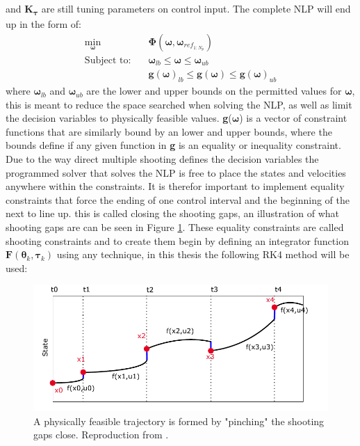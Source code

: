and \textbf{K}\textsubscript{$\bm{\tau}$} are still tuning parameters on control input. The complete NLP will end up in the form of:
\begin{subequations}
    \label{EQ:NLP}
    \begin{align}
        \min_{\bm{\omega}} \quad & \bm{\Phi}(\bm{\omega}, \bm{\omega}_{ref_{1:N_p}}) \\ %
        \textrm{Subject to:} \quad & \bm{\omega}_{lb} \leq \bm{\omega} \leq \bm{\omega}_{ub} \\
                            \quad & \textbf{g}(\bm{\omega})_{lb} \leq \textbf{g}(\bm{\omega}) \leq \textbf{g}(\bm{\omega})_{ub}
    \end{align}
\end{subequations}
where $\bm{\omega}_{lb}$ and $\bm{\omega}_{ub}$ are the lower and upper bounds on the permitted values for $\bm{\omega}$, this is meant to reduce the space searched when
solving the NLP, as well as limit the decision variables to physically feasible values. \textbf{g}($\bm{\omega}$) is a vector of constraint functions that are similarly bound
by an lower and upper bounds, where the bounds define if any given function in \textbf{g} is an equality or inequality constraint. Due to the way direct multiple shooting
defines the decision variables the programmed solver that solves the \gls{NLP} is free to place the states and velocities anywhere within the constraints. It is therefor
important to implement equality constraints that force the ending of one control interval and the beginning of the next to line up. this is called closing the shooting gaps, 
an illustration of what shooting gaps are can be seen in Figure \ref{FIG: Shooting Gaps}. These equality constraints are called shooting constraints and to create them begin
by defining an integrator function $\textbf{F}(\bm{\theta}_{k}, \bm{\tau}_k)$ using any technique, in this thesis the following \gls{RK4} method will be used:

\begin{figure}
    \includegraphics[width=\textwidth]{Images/MultipleShooting.pdf}
    \caption{A physically feasible trajectory is formed by "pinching" the shooting gaps close. Reproduction from \cite{gros2017Lecture}.}
    \label{FIG: Shooting Gaps}
\end{figure}

